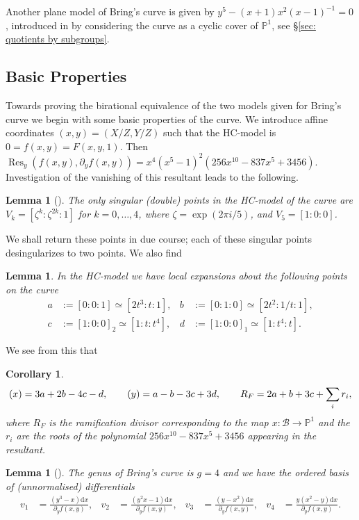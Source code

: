 \documentclass{amsart}
\newtheorem{lemma}[theorem]{Lemma}
\newtheorem{corollary}[theorem]{Corollary}
\let\div\relax
\DeclareMathOperator{\div}{div}
\DeclareMathOperator{\Res}{Res}
\newcommand{\dif}{\mathrm{d}}
\begin{document}
Another plane model of Bring's curve is given by $y^5-(x+1)x^2(x-1)^{-1}=0$, introduced in \cite[Proposition 3.1]{Weber2005} by considering the curve as a cyclic cover of $\mathbb{P}^1$, see \S\ref{sec: quotients by subgroups}. 

\subsection{Basic Properties}
Towards proving the birational equivalence of the two models given for Bring's curve we begin with some basic properties of the curve. We introduce affine coordinates $(x,y)=(X/Z,Y/Z)$ such that the HC-model is $0=f(x,y)=F(x,y,1)$. 
Then $\Res_y(f(x,y),\partial_y f(x,y))=x^4(x^5-1)^2(256x^{10}-837 x^5+3456)$. Investigation of the vanishing of this resultant leads to the following.
\begin{lemma}[\cite{Braden2012}]\label{HCdoublepoints}
 The only singular (double) points in the HC-model of the curve are
$V_k = [\zeta^k : \zeta^{2k} : 1]$ for $k=0, \dots, 4$, where $\zeta=\exp(2\pi i/5)$,  and $V_5 = [1:0:0]$.
\end{lemma}
We shall return these points in due course; each of these singular points desingularizes to two points. We also find
\begin{lemma}\label{lemma: local expansion in Bring's curve}
In the HC-model we have local
expansions about the following points on the curve
\begin{align*}
a&:=[0:0:1]\simeq[2t^3:t:1],& b&:=[0:1:0]\simeq[2t^2:1/t:1],\\
c&:=[1:0:0]_2\simeq[1:t:t^4],& d&:=[1:0:0]_1\simeq[1:t^4:t].
\end{align*}
\end{lemma}
We see from this that
\begin{corollary}
$$
\div(x)=3a+2b-4c-d,\qquad \div(y)=a-b-3c+3d,\qquad R_F = 2a + b+ 3c + \sum_i r_i,
$$ 
where $R_F$ is the ramification divisor corresponding to the map $x:\mathcal{B} \to \mathbb{P}^1$ and the $r_i$ are the roots of the polynomial $256 x^{10} - 837 x^5 + 3456$ appearing in the resultant.
\end{corollary}
\begin{lemma}[\cite{Braden2012}]\label{lemma: basis of differentials}
The genus of Bring's curve is $g=4$ and we have the ordered basis of (unnormalised) differentials
\begin{align*}
  v_1 &= \frac{(y^3-x)\dif x}
    {\partial_y f(x,y)}, &
  v_2 &= \frac{(y^2x-1)\dif x}
    {\partial_y f(x,y)}, &
  v_3 &= \frac{(y-x^2)\dif x}
    {\partial_y f(x,y)}, &
  v_4 &= \frac{y(x^2-y)\dif x}
    {\partial_y f(x,y)}.
\end{align*}
\end{lemma}
\end{document}
